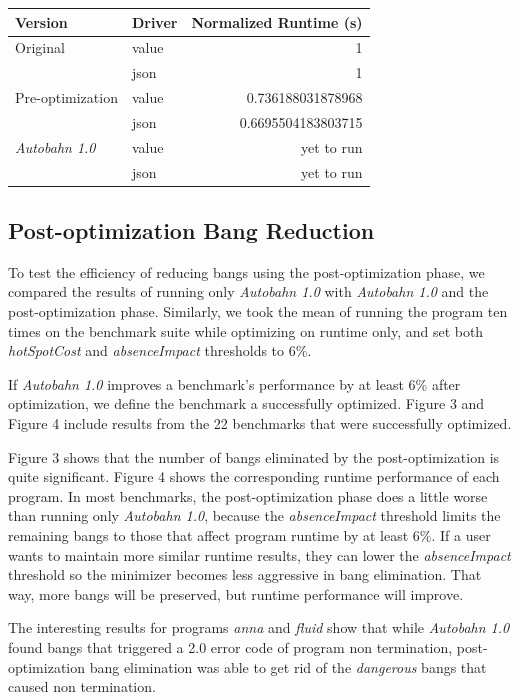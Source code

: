 \documentclass[format=sigplan]{acmart}
\newcommand{\hotspotcost}[0]{\textit{hotSpotCost}}
\newcommand{\dangerous}[0]{\textit{dangerous}}
\newcommand{\Ao}[0]{\textit{Autobahn 1.0}}
\newcommand{\postopt}[0]{post-optimization}
\newcommand{\Postopt}[0]{Post-optimization}
\newcommand{\absim}[0]{\textit{absenceImpact}}
\begin{document}
\begin{tabular}{llr}
\hline
Version   & Driver & Normalized Runtime (s) \\
\hline
Original      & value   & 1     \\
          & json        & 1      \\
Pre-optimization       & value     & 0.736188031878968     \\
          & json        & 0.6695504183803715	\\
\Ao{}       & value     & yet to run      \\
          & json        & yet to run	\\

\hline
\end{tabular}

\subsection{\Postopt{} Bang Reduction}

To test the efficiency of reducing bangs using the \postopt{} phase, we compared the results of running only \Ao{} with \Ao{} and the \postopt{} phase. Similarly, we took the mean of running the program ten times on the benchmark suite while optimizing on runtime only, and set both \hotspotcost{} and \absim{} thresholds to 6\%. 

If \Ao{} improves a benchmark's performance by at least 6\% after optimization, we define the benchmark a successfully optimized. Figure 3 and Figure 4 include results from the 22 benchmarks that were successfully optimized. 

Figure 3 shows that the number of bangs eliminated by the \postopt{} is quite significant. Figure 4 shows the corresponding runtime performance of each program. In most benchmarks, the \postopt{} phase does a little worse than running only \Ao{}, because the \absim{} threshold limits the remaining bangs to those that affect program runtime by at least 6\%. If a user wants to maintain more similar runtime results, they can lower the \absim{} threshold so the minimizer becomes less aggressive in bang elimination. That way, more bangs will be preserved, but runtime performance will improve. 

The interesting results for programs \textit{anna} and \textit{fluid} show that while \Ao{} found bangs that triggered a 2.0 error code of program non termination, \postopt{} bang elimination was able to get rid of the \dangerous{} bangs that caused non termination.
\end{document}
